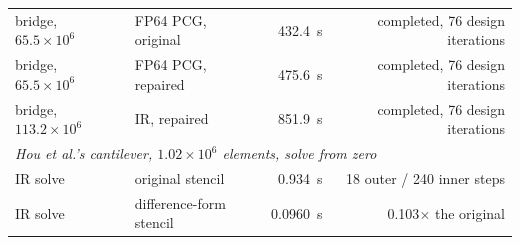 \begin{tabular}{llrr}
bridge, $65.5\times10^{6}$ & FP64 PCG, original & 432.4~s & completed, 76 design iterations \\
bridge, $65.5\times10^{6}$ & FP64 PCG, repaired & 475.6~s & completed, 76 design iterations \\
bridge, $113.2\times10^{6}$ & IR, repaired & 851.9~s & completed, 76 design iterations \\
\midrule
\multicolumn{4}{l}{\emph{Hou et al.'s cantilever, $1.02\times10^{6}$ elements, solve from zero}} \\
IR solve & original stencil & 0.934~s & 18 outer / 240 inner steps \\
IR solve & difference-form stencil & 0.0960~s & 0.103$\times$ the original \\
\bottomrule
\end{tabular}
